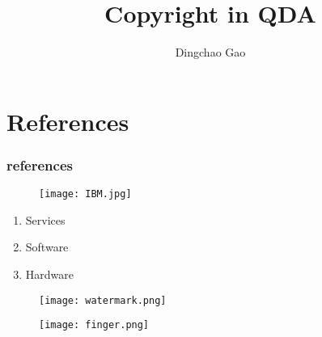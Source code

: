 \documentclass[18 pt]{beamer}
\title{Copyright in QDA }
\author[Gcc]{Dingchao Gao}
\institute[ISCAS]{Institute of Software Chinese Academy of Sciences}
\begin{document}
\begin{frame}[plain]
  \titlepage
\end{frame}

\section{References}
\begin{frame}
	\frametitle{references}
  \nocite{*}
  \printbibliography
\end{frame}

\begin{frame}
  \begin{figure}
    \texttt{[image: IBM.jpg]}
  \end{figure}
\end{frame}

\begin{frame}
  \begin{enumerate}
    \item Services
    \item Software
    \item Hardware
  \end{enumerate}
\end{frame}
\begin{frame}
  \begin{figure}
    \texttt{[image: watermark.png]}
  \end{figure}
\end{frame}
\begin{frame}
  \begin{figure}
    \texttt{[image: finger.png]}
  \end{figure}
\end{frame}
\end{document}
